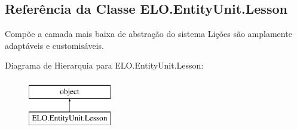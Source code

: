 \hypertarget{classELO_1_1EntityUnit_1_1Lesson}{}\subsection{Referência da Classe E\+L\+O.\+Entity\+Unit.\+Lesson}
\label{classELO_1_1EntityUnit_1_1Lesson}


Compõe a camada mais baixa de abstração do sistema Lições são amplamente adaptáveis e customisáveis.  


Diagrama de Hierarquia para E\+L\+O.\+Entity\+Unit.\+Lesson\+:\begin{figure}[H]
\begin{center}
\leavevmode
\includegraphics[height=2.000000cm]{dc/d13/classELO_1_1EntityUnit_1_1Lesson}
\end{center}
\end{figure}
